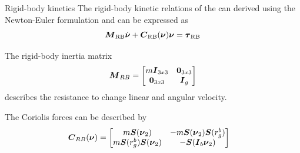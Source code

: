 \documentclass[11pt]{beamer}
\begin{document}
\begin{frame}{Rigid-body kinetics}
The rigid-body kinetic relations of the \abbrROV can derived using the Newton-Euler formulation and can be expressed as
\begin{equation}\label{eq:rb}
\boldsymbol{M}_{\text{RB}}\dot{\boldsymbol{\nu}} + \boldsymbol{C}_{\text{RB}}(\boldsymbol{\nu})\boldsymbol{\nu} = \boldsymbol{\tau}_{\text{RB}}
\end{equation}

The rigid-body inertia matrix
\begin{equation}
   \boldsymbol{M}_{RB} = 
    \begin{bmatrix}
        m\boldsymbol{I}_{3x3} & \boldsymbol{0}_{3x3} \\
        \boldsymbol{0}_{3x3} & \boldsymbol{I}_{g}
    \end{bmatrix}
\end{equation}
describes the resistance to change linear and angular velocity.

The Coriolis forces can be described by
\begin{equation}
\begin{split}
    \boldsymbol{C}_{RB}(\boldsymbol{\nu}) &= 
    \begin{bmatrix}
        m\boldsymbol{S}(\boldsymbol{\nu}_{2})              & -m\boldsymbol{S}(\boldsymbol{\nu}_{2})\boldsymbol{S}(r_g^b)  \\
        m\boldsymbol{S}(r_g^b)\boldsymbol{S}(\boldsymbol{\nu}_{2}) & -\boldsymbol{S}(\boldsymbol{I}_{b}\boldsymbol{\nu}_{2}) \\
    \end{bmatrix}
\end{split}
\end{equation}
\end{frame}
\end{document}
